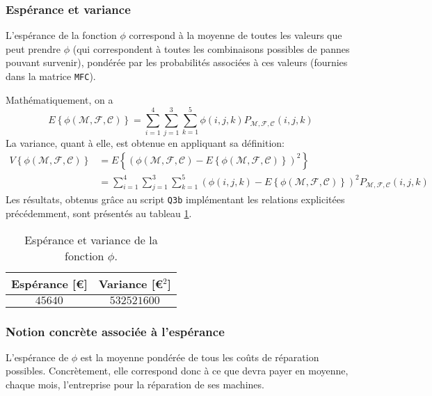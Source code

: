 \documentclass[a4paper, 12pt]{article}
\newcommand{\M}{\mathcal{M}}
\newcommand{\F}{\mathcal{F}}
\newcommand{\C}{\mathcal{C}}
\begin{document}
	\subsubsection{Espérance et variance}
	\label{subsec:subsec_Q3b_i}
	L'espérance de la fonction \(\phi\) correspond à la moyenne de toutes les valeurs que peut prendre \(\phi\) (qui correspondent à toutes les combinaisons possibles de pannes pouvant survenir), pondérée par les probabilités associées à ces valeurs (fournies dans la matrice \texttt{MFC}).\par
	Mathématiquement, on a
	\begin{displaymath}
	    E\left\{\phi\left(\M, \F, \C\right)\right\} = \sum_{i=1}^{4}\sum_{j=1}^{3}\sum_{k=1}^{5}\phi\left(i,j,k\right)P_{\M,\F,\C}\left(i,j,k\right)
	\end{displaymath}
	La variance, quant à elle, est obtenue en appliquant sa définition:
	\begin{align*}
	    V\left\{\phi\left(\M, \F, \C\right)\right\} &= E\left\{\left(\phi\left(\M, \F, \C\right) - E\left\{\phi\left(\M, \F, \C\right)\right\}\right)^2\right\}\\
	    &= \sum_{i=1}^{4}\sum_{j=1}^{3}\sum_{k=1}^{5}\left(\phi\left(i,j,k\right) - E\left\{\phi\left(\M, \F, \C\right)\right\}\right)^2P_{\M,\F,\C}\left(i,j,k\right)
	\end{align*}
	Les résultats, obtenus grâce au script \texttt{Q3b} implémentant les relations explicitées précédemment, sont présentés au tableau \ref{tab:tab_Q3b}.
	\begin{table}[!ht]
	    \centering
	    \begin{tabular}{|c|c|}
	        \hline
	        \textbf{Espérance} [\euro{}] & \textbf{Variance} [\euro{}\(^2\)]\\
	        \hline
	        \hline
	        \(\num{45640}\) & \(\num{532521600}\)\\
	        \hline
	    \end{tabular}
	    \caption{Espérance et variance de la fonction \(\phi\).}
	    \label{tab:tab_Q3b}
	\end{table}
	\subsubsection{Notion concrète associée à l'espérance}
	L'espérance de \(\phi\) est la moyenne pondérée de tous les coûts de réparation possibles. Concrètement, elle correspond donc à ce que devra payer en moyenne, chaque mois, l'entreprise pour la réparation de ses machines.
\end{document}
